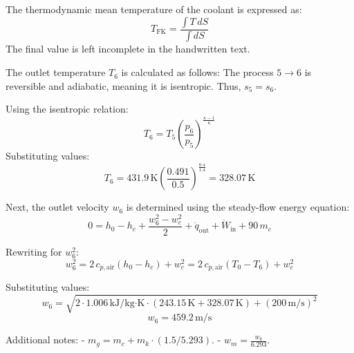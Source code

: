 The thermodynamic mean temperature of the coolant is expressed as:  
\[
T_{\text{FK}} = \frac{\int T \, dS}{\int dS}
\]  
The final value is left incomplete in the handwritten text.

The outlet temperature \( T_6 \) is calculated as follows:  
The process \( 5 \rightarrow 6 \) is reversible and adiabatic, meaning it is isentropic. Thus, \( s_5 = s_6 \).  

Using the isentropic relation:  
\[
T_6 = T_5 \left( \frac{p_6}{p_5} \right)^{\frac{\kappa - 1}{\kappa}}
\]  
Substituting values:  
\[
T_6 = 431.9 \, \text{K} \left( \frac{0.491}{0.5} \right)^{\frac{0.4}{1.4}} = 328.07 \, \text{K}
\]  

Next, the outlet velocity \( w_6 \) is determined using the steady-flow energy equation:  
\[
0 = h_0 - h_c + \frac{w_6^2 - w_c^2}{2} + \dot{q}_{\text{out}} + \dot{W}_{\text{in}} + 90 \, m_c
\]  

Rewriting for \( w_6^2 \):  
\[
w_6^2 = 2 \, c_{p,\text{air}} (h_0 - h_c) + w_c^2 = 2 \, c_{p,\text{air}} (T_0 - T_6) + w_c^2
\]  

Substituting values:  
\[
w_6 = \sqrt{2 \cdot 1.006 \, \text{kJ/kg·K} \cdot (243.15 \, \text{K} + 328.07 \, \text{K}) + (200 \, \text{m/s})^2}
\]  
\[
w_6 = 459.2 \, \text{m/s}
\]  

Additional notes:  
- \( m_g = m_c + m_k \cdot (1.5/5.293) \).  
- \( w_m = \frac{w_k}{6.293} \).
